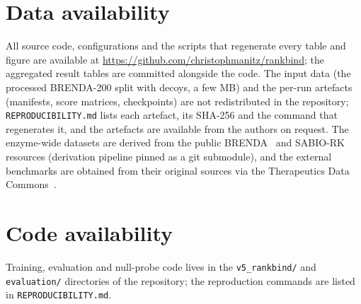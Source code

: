 \documentclass[11pt,a4paper]{article}
\begin{document}
\section*{Data availability}
All source code, configurations and the scripts that regenerate every table
and figure are available at \url{https://github.com/christophmanitz/rankbind};
the aggregated result tables are committed alongside the code. The input
data (the processed BRENDA-200 split with decoys, a few MB) and the
per-run artefacts (manifests, score matrices, checkpoints) are not
redistributed in the repository; \texttt{REPRODUCIBILITY.md} lists each
artefact, its SHA-256 and the command that regenerates it, and the
artefacts are available from the authors on request. The enzyme-wide
datasets are derived from the public BRENDA~\citep{chang2021brenda} and
SABIO-RK~\citep{wittig2018sabiork} resources (derivation pipeline pinned as
a git submodule), and the external benchmarks are obtained from their
original sources via the Therapeutics Data Commons~\citep{huang2021tdc}.

\section*{Code availability}
Training, evaluation and null-probe code lives in the \texttt{v5\_rankbind/}
and \texttt{evaluation/} directories of the repository; the reproduction
commands are listed in \texttt{REPRODUCIBILITY.md}.



\end{document}
